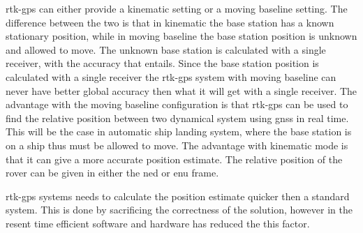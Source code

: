 \gls{rtk-gps} can either provide a kinematic setting or a moving baseline setting. The difference between the two is that in kinematic the base station has a known stationary position, while in moving baseline the base station position is unknown and allowed to move. The unknown base station is calculated with a single receiver, with the accuracy that entails. Since the base station position is calculated with a single receiver the \gls{rtk-gps} system with moving baseline can never have better global accuracy then what it will get with a single receiver. The advantage with the moving baseline configuration is that \gls{rtk-gps} can be used to find the relative position between two dynamical system using \gls{gnss} in real time. This will be the case in automatic ship landing system, where the base station is on a ship thus must be allowed to move. The advantage with kinematic mode is that it can give a more accurate position estimate. The relative position of the rover can be given in either the \gls{ned} or {enu} frame.

\gls{rtk-gps} systems needs to calculate the position estimate quicker then a standard  system. This is done by sacrificing the correctness of the solution, however in the resent time efficient software and hardware has reduced the this factor.

\cleardoublepage